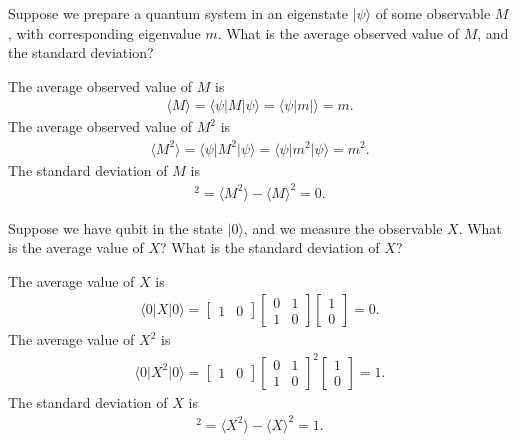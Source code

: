 \documentclass[en]{sol-man}
\begin{document}
\begin{exe}
    Suppose we prepare a quantum system in an eigenstate $\lvert\psi\rangle$ of some observable $M$, with corresponding eigenvalue $m$. What is the average observed value of $M$, and the standard deviation?
\end{exe}
\begin{sol}
    The average observed value of $M$ is
    \begin{align}
        \langle M\rangle=\langle\psi\rvert M\lvert\psi\rangle=\langle\psi\rvert m\lvert\rangle=m.
    \end{align}
    The average observed value of $M^2$ is
    \begin{align}
        \langle M^2\rangle=\langle\psi\rvert M^2\lvert\psi\rangle=\langle\psi\rvert m^2\lvert\psi\rangle=m^2.
    \end{align}
    The standard deviation of $M$ is
    \begin{align}
        [\Delta(M)]^2=\langle M^2\rangle-\langle M\rangle^2=0.
    \end{align}
\end{sol}

\begin{exe}
    Suppose we have qubit in the state $\lvert 0\rangle$, and we measure the observable $X$. What is the average value of $X$? What is the standard deviation of $X$?
\end{exe}
\begin{sol}
    The average value of $X$ is
    \begin{align}
        \langle 0\rvert X\lvert 0\rangle=\left[\begin{matrix}
            1&0
        \end{matrix}\right]\left[\begin{matrix}
            0&1\\
            1&0
        \end{matrix}\right]\left[\begin{matrix}
            1\\
            0
        \end{matrix}\right]=0.
    \end{align}
    The average value of $X^2$ is
    \begin{align}
        \langle 0\rvert X^2\lvert 0\rangle=\left[\begin{matrix}
            1&0
        \end{matrix}\right]\left[\begin{matrix}
            0&1\\
            1&0
        \end{matrix}\right]^2\left[\begin{matrix}
            1\\
            0
        \end{matrix}\right]=1.
    \end{align}
    The standard deviation of $X$ is
    \begin{align}
        [\Delta(X)]^2=\langle X^2\rangle-\langle X\rangle^2=1.
    \end{align}
\end{sol}
\end{document}
